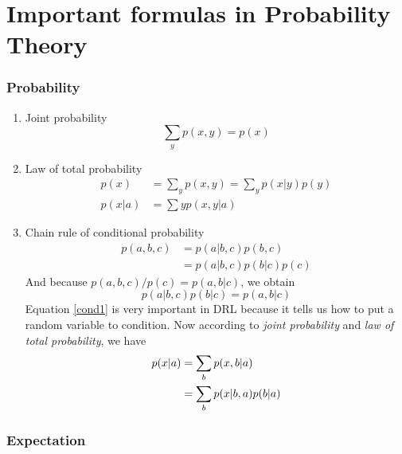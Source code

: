 \part{Important formulas in Probability Theory}

\section{Probability}

  \begin{enumerate}

    \item
          Joint probability
          \begin{equation*}
            \sum_{y}p(x,y)=p(x)
          \end{equation*}
    \item
          Law of total probability
          \begin{align*}
            p(x)   & = \sum_{y}p(x,y) = \sum_{y}p(x|y)p(y) \\
            p(x|a) & = \sum{y}p(x,y|a)
          \end{align*}
    \item
          Chain rule of conditional probability
          \begin{align*}
            p(a,b,c) & = p(a|b,c)p(b,c)     \\
                     & = p(a|b,c)p(b|c)p(c)
          \end{align*}
          And because $p(a,b,c)/p(c)=p(a,b|c)$, we obtain
          \begin{equation}
            \label{cond1}
            p(a|b,c)p(b|c) = p(a,b|c)
          \end{equation}
          Equation \ref{cond1} is very important in DRL because it tells us how to put a random variable to condition. Now
          according to \emph{joint probability} and \emph{law of total probability}, we have
          \begin{align}
            p(x|a) & = \sum_{b}p(x,b|a) \notag \\
                   & = \sum_{b}p(x|b,a)p(b|a)
          \end{align}
  \end{enumerate}

\section{Expectation}

